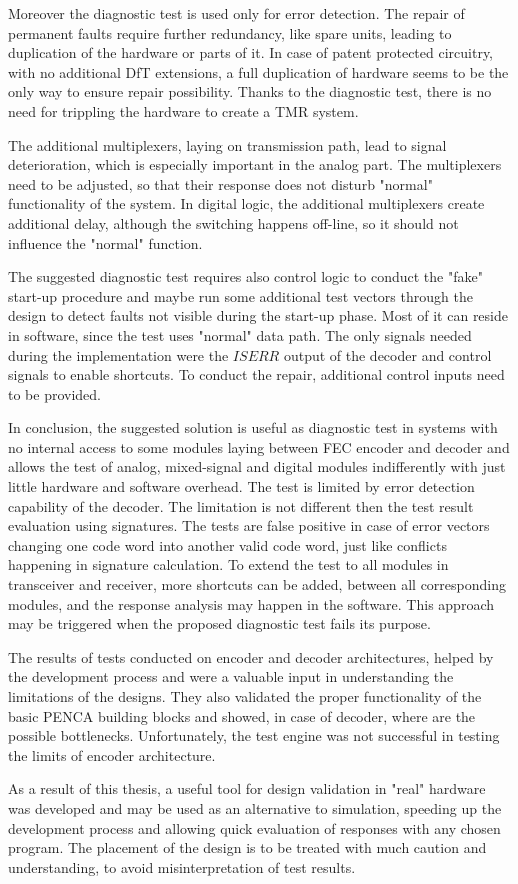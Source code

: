 Moreover the diagnostic test is used only for error detection. The repair of permanent faults require further redundancy, like spare units, leading to duplication of the hardware or parts of it. In case of patent protected circuitry, with no additional DfT extensions, a full duplication of hardware seems to be the only way to ensure repair possibility. Thanks to the diagnostic test, there is no need for trippling the hardware to create a TMR system.

The additional multiplexers, laying on transmission path, lead to signal deterioration, which is especially important in the analog part. The multiplexers need to be adjusted, so that their response does not disturb "normal" functionality of the system. In digital logic, the additional multiplexers create additional delay, although the switching happens off-line, so it should not influence the "normal" function.

The suggested diagnostic test requires also control logic to conduct the "fake" start-up procedure and maybe run some additional test vectors through the design to detect faults not visible during the start-up phase. Most of it can reside in software, since the test uses "normal" data path. The only signals needed during the implementation were the $ISERR$ output of the decoder and control signals to enable shortcuts. To conduct the repair, additional control inputs need to be provided.

In conclusion, the suggested solution is useful as diagnostic test in systems with no internal access to some modules laying between FEC encoder and decoder and allows the test of analog, mixed-signal and digital modules indifferently with just little hardware and software overhead. The test is limited by error detection capability of the decoder. The limitation is not different then the test result evaluation using signatures. The tests are false positive in case of error vectors changing one code word into another valid code word, just like conflicts happening in signature calculation. To extend the test to all modules in transceiver and receiver, more shortcuts can be added, between all corresponding modules, and the response analysis may happen in the software. This approach may be triggered when the proposed diagnostic test fails its purpose.

The results of tests conducted on encoder and decoder architectures, helped by the development process and were a valuable input in understanding the limitations of the designs. They also validated the proper functionality of the basic PENCA building blocks and showed, in case of decoder, where are the possible bottlenecks. Unfortunately, the test engine was not successful in testing the limits of encoder architecture.

As a result of this thesis, a useful tool for design validation in "real" hardware was developed and may be used as an alternative to simulation, speeding up the development process and allowing quick evaluation of responses with any chosen program. The placement of the design is to be treated with much caution and understanding, to avoid misinterpretation of test results. 